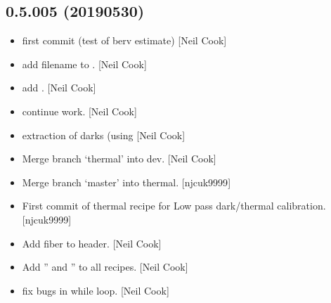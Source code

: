 \documentclass[a4paper,10pt,english]{report}
\begin{document}
\subsection{0.5.005 (2019\sphinxhyphen{}05\sphinxhyphen{}30)}
\label{\detokenize{misc/changelog:id150}}\begin{itemize}
\item {} 
 \sphinxhyphen{} first commit (test of berv estimate) {[}Neil Cook{]}

\item {} 
 \sphinxhyphen{} add filename to . {[}Neil Cook{]}

\item {} 
 \sphinxhyphen{} add . {[}Neil Cook{]}

\item {} 
 \sphinxhyphen{} continue work. {[}Neil Cook{]}

\item {} 
 \sphinxhyphen{} extraction of darks (using  {[}Neil
Cook{]}

\item {} 
Merge branch ‘thermal’ into dev. {[}Neil Cook{]}

\item {} 
Merge branch ‘master’ into thermal. {[}njcuk9999{]}

\item {} 
First commit of thermal recipe for Low pass dark/thermal calibration.
{[}njcuk9999{]}

\item {} 
Add fiber to header. {[}Neil Cook{]}

\item {} 
Add ” and ” to all recipes. {[}Neil Cook{]}

\item {} 
 \sphinxhyphen{} fix bugs in while loop. {[}Neil Cook{]}

\end{itemize}
\end{document}
